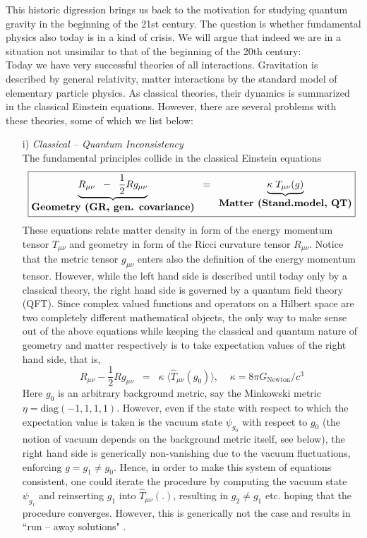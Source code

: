 \documentclass[12pt]{report}
\def\be{\begin{equation}}
\def\ee{\end{equation}}
\def\blue{\relax}
\def\green{\relax}
\begin{document}
This historic digression brings us back to the motivation for studying
quantum gravity in the beginning of the 21st century. The question is 
whether fundamental physics also today is in a kind of crisis.
We will argue that indeed
we are in a situation not unsimilar to that of the beginning of the 
20th century:\\
Today we have very successful theories of all interactions.
Gravitation is described by general relativity, matter interactions  
by the standard model of elementary particle physics. As classical 
theories, their dynamics is summarized in the classical Einstein equations. 
However, there are several problems with these theories, some of 
which we list below:
%
\begin{itemize}
%
\item[i)] {\it Classical -- Quantum Inconsistency}\\
The fundamental principles collide in the classical Einstein equations
\be \nonumber
\fbox{$\displaystyle
\underbrace{R_{\mu\nu}\;\;-\;\;\frac{1}{2}R g_{\mu\nu}}_{{\blue 
\mbox{{\bf Geometry (GR, gen. covariance)}}}}
\;\;=\;\; 
\underbrace{\kappa\; T_{\mu\nu}(g)}_{{\green 
\mbox{{\bf Matter (Stand.model, QT)}}}}
$} 
\ee
These equations relate matter density in form of the energy momentum
tensor $T_{\mu\nu}$ and geometry in form of the Ricci curvature tensor 
$R_{\mu\nu}$. Notice that the metric tensor $g_{\mu\nu}$ enters also the 
definition of the energy momentum tensor. However,
while the left hand side is described until today only by a classical 
theory,
the right hand side is governed by a quantum field theory (QFT). Since
complex valued functions and operators on a Hilbert space are two 
completely different mathematical objects, the only way to make sense
out of the above equations while keeping the classical and quantum nature 
of 
geometry and matter respectively is to take expectation values of the 
right hand side, that is, 
\be \nonumber 
R_{\mu\nu}-\frac{1}{2}R g_{\mu\nu}\;\;=\;\;\kappa\; 
\langle\hat{T}_{\mu\nu}(g_0)\rangle,
\;\;\;\;\kappa=8\pi G_{\mbox{Newton}}/c^3
\ee
Here $g_0$ is an arbitrary background metric, 
say the Minkowski metric $\eta=\mbox{diag}(-1,1,1,1)$.
However, even if the state with respect to which the expectation value is 
taken is 
the vacuum state $\psi_{g_0}$ with respect to $g_0$ (the notion of vacuum
depends on the background metric itself, see below), 
the right hand side is generically non-vanishing due to the vacuum 
fluctuations, enforcing $g=g_1\not=g_0$. Hence, 
in order to make this system of equations consistent, one could iterate 
the procedure by computing the vacuum state $\psi_{g_1}$ and reinserting 
$g_1$ into $\hat{T}_{\mu\nu}(.)$, resulting in $g_2\not=g_1$ etc.
hoping that the procedure converges. However, this is generically not the 
case and results in ``run -- away solutions" \cite{1}.


\end{itemize}
\end{document}
